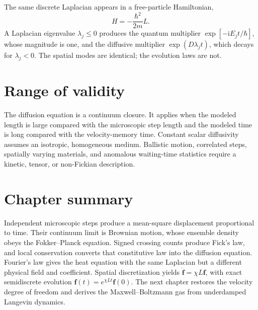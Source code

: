 The same discrete Laplacian appears in a free-particle Hamiltonian,
\begin{equation}
  H=-\frac{\hbar^2}{2m}L.
  \label{eq:transport-free-hamiltonian}
\end{equation}
A Laplacian eigenvalue $\lambda_j\leq0$ produces the quantum multiplier
$\exp[-\mathrm iE_jt/\hbar]$, whose magnitude is one, and the diffusive
multiplier $\exp(D\lambda_jt)$, which decays for $\lambda_j<0$.  The spatial
modes are identical; the evolution laws are not.

\section{Range of validity}

The diffusion equation is a continuum closure.  It applies when the modeled
length is large compared with the microscopic step length and the modeled time
is long compared with the velocity-memory time.  Constant scalar diffusivity
assumes an isotropic, homogeneous medium.  Ballistic motion, correlated steps,
spatially varying materials, and anomalous waiting-time statistics require a
kinetic, tensor, or non-Fickian description.

\section{Chapter summary}

Independent microscopic steps produce a mean-square displacement proportional
to time.  Their continuum limit is Brownian motion, whose ensemble density
obeys the Fokker--Planck equation.  Signed crossing counts produce Fick's law,
and local conservation converts that constitutive law into the diffusion
equation.  Fourier's law gives the heat equation with the same Laplacian but a
different physical field and coefficient.  Spatial discretization yields
$\dot{\bm f}=\chi L\bm f$, with exact semidiscrete evolution
$\bm f(t)=e^{\chi Lt}\bm f(0)$.  The next chapter restores the velocity degree
of freedom and derives the Maxwell--Boltzmann gas from underdamped Langevin
dynamics.
